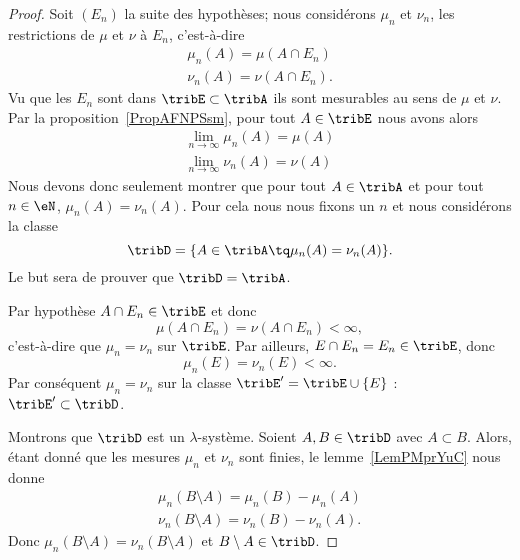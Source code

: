 \begin{proof}
    Soit \( (E_n)\) la suite des hypothèses; nous considérons \( \mu_n\) et \( \nu_n\), les restrictions de \( \mu\) et \( \nu\) à \( E_n\), c'est-à-dire
    \begin{subequations}
        \begin{align}
        \mu_n(A)=\mu(A\cap E_n)\\
        \nu_n(A)=\nu(A\cap E_n).
        \end{align}
    \end{subequations}
    Vu que les \( E_n\) sont dans \( \tribE\subset\tribA\) ils sont mesurables au sens de \( \mu\) et \( \nu\). Par la proposition~\ref{PropAFNPSsm}, pour tout \( A\in \tribE\) nous avons alors
    \begin{subequations}
        \begin{align}
            \lim_{n\to \infty} \mu_n(A)=\mu(A)\\
            \lim_{n\to \infty} \nu_n(A)=\nu(A)
        \end{align}
    \end{subequations}
    Nous devons donc seulement montrer que pour tout \( A\in\tribA\) et pour tout \( n\in\eN\), \( \mu_n(A)=\nu_n(A)\). Pour cela nous nous fixons un \( n\) et nous considérons la classe
    \begin{equation}
        \tribD=\{ A\in\tribA\tq\mu_n(A)=\nu_n(A) \}.
    \end{equation}
    Le but sera de prouver que \( \tribD=\tribA\).


    Par hypothèse \( A\cap E_n\in\tribE\) et donc
    \begin{equation}
        \mu(A\cap E_n)=\nu(A\cap E_n)<\infty,
    \end{equation}
    c'est-à-dire que \( \mu_n=\nu_n\) sur \( \tribE\). Par ailleurs, \( E\cap E_n=E_n\in\tribE\), donc
    \begin{equation}
        \mu_n(E)=\nu_n(E)<\infty.
    \end{equation}
    Par conséquent \( \mu_n=\nu_n\) sur la classe \( \tribE'=\tribE\cup\{ E \}\) : \( \tribE'\subset\tribD\).

    Montrons que \( \tribD\) est un \( \lambda\)-système. Soient \( A,B\in\tribD\) avec \( A\subset B\). Alors, étant donné que les mesures \( \mu_n\) et \( \nu_n\) sont finies, le lemme~\ref{LemPMprYuC} nous donne
    \begin{subequations}
        \begin{align}
            \mu_n(B\setminus A)=\mu_n(B)-\mu_n(A)\\
            \nu_n(B\setminus A)=\nu_n(B)-\nu_n(A).
        \end{align}
    \end{subequations}
    Donc \( \mu_n(B\setminus A)=\nu_n(B\setminus A)\) et \( B\setminus A\in\tribD\).


\end{proof}
